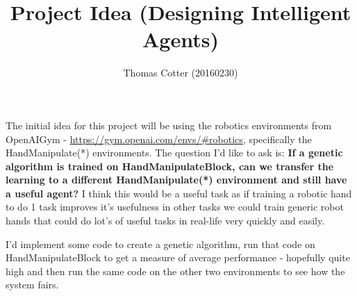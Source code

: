 \documentclass{article}
\title{Project Idea (Designing Intelligent Agents)}
\author{Thomas Cotter (20160230)}
\begin{document}
	\maketitle
	
	The initial idea for this project will be using the robotics environments from OpenAIGym - \url{https://gym.openai.com/envs/\#robotics}, specifically the HandManipulate(*) environments. The question I'd like to ask is: \textbf{If a genetic algorithm is trained on HandManipulateBlock, can we transfer the learning to a different HandManipulate(*) environment and still have a useful agent?} I think this would be a useful task as if training a robotic hand to do 1 task improves it's usefulness in other tasks we could train generic robot hands that could do lot's of useful tasks in real-life very quickly and easily.

	\medbreak

	I'd implement some code to create a genetic algorithm, run that code on HandManipulateBlock to get a measure of average performance - hopefully quite high and then run the same code on the other two environments to see how the system fairs.
\end{document}
